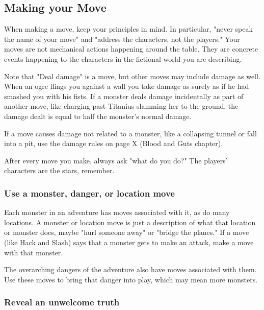        
\subsection{Making your Move}   
       

When making a move, keep your principles in mind. In particular, "never speak the name of your move" and "address the characters, not the players." Your moves are not mechanical actions happening around the table. They are concrete events happening to the characters in the fictional world you are describing.

       

Note that "Deal damage" is a move, but other moves may include damage as well. When an ogre flings you against a wall you take damage as surely as if he had smashed you with his fists. If a monster deals damage incidentally as part of another move, like charging past Titanius slamming her to the ground, the damage dealt is equal to half the monster's normal damage.

       

If a move causes damage not related to a monster, like a collapsing tunnel or fall into a pit, use the damage rules on page X (Blood and Guts chapter).

       

After every move you make, always ask "what do you do?" The players' characters are the stars, remember.

       
\subsubsection{Use a monster, danger, or location move}      
       

Each monster in an adventure has moves associated with it, as do many locations. A monster or location move is just a description of what that location or monster does, maybe "hurl someone away" or "bridge the planes." If a move (like Hack and Slash) says that a monster gets to make an attack, make a move with that monster.

       

The overarching dangers of the adventure also have moves associated with them. Use these moves to bring that danger into play, which may mean more monsters.

       
\subsubsection{Reveal an unwelcome truth}     
       

